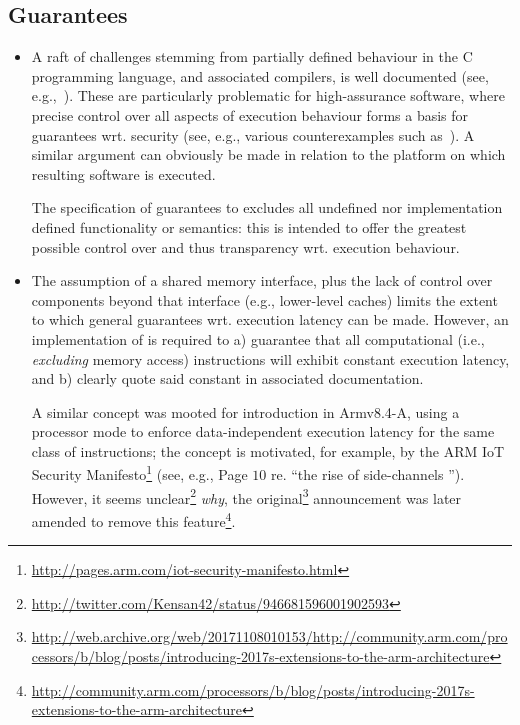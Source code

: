 
\subsection{Guarantees}
\label{sec:bg:guarantee}

\begin{itemize}

\item A raft of challenges stemming from partially defined behaviour in the
      C programming language, and associated compilers, is well documented
      (see, e.g.,~\cite[Section 2.1]{SCARV:SimChiAnd:18}).
      These are particularly problematic for high-assurance software, where
      precise control over all aspects of execution behaviour forms a basis
      for guarantees wrt. security
      (see, e.g., various counterexamples such as~\cite{SCARV:KPVV:16}).
      A similar argument can obviously be made in relation to the platform 
      on which resulting software is executed.

      The specification of \XCID guarantees to excludes all
                   undefined 
      nor 
      implementation defined
      functionality or semantics:
      this is intended to offer the greatest possible control over and thus
      transparency wrt. execution behaviour.

\item The assumption of a shared memory interface, plus the lack of control
      over components beyond that interface 
      (e.g., lower-level caches) 
      limits the extent to which general guarantees wrt. execution latency 
      can be made.  However, an implementation of \XCID is required to 
      a) guarantee that all computational 
         (i.e., {\em excluding} memory access) 
         instructions will exhibit constant execution latency,
         and
      b) clearly quote said constant in associated documentation.

      A similar concept was mooted for introduction in Armv8.4-A, using a
      processor mode to enforce data-independent execution latency for the
      same class of instructions; the concept is motivated, for example,
      by the ARM IoT Security Manifesto\footnote{
      \url{http://pages.arm.com/iot-security-manifesto.html}
      } (see, e.g., Page $10$ re. ``the rise of side-channels '').
      However, it seems unclear\footnote{
      \url{http://twitter.com/Kensan42/status/946681596001902593}
      } {\em why}, the original\footnote{
      \url{http://web.archive.org/web/20171108010153/http://community.arm.com/processors/b/blog/posts/introducing-2017s-extensions-to-the-arm-architecture}
      } announcement was later amended to remove this feature\footnote{
      \url{http://community.arm.com/processors/b/blog/posts/introducing-2017s-extensions-to-the-arm-architecture}
      }.

\end{itemize}

